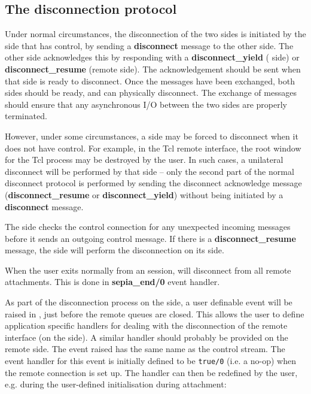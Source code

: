 \subsection{The disconnection protocol}
\label{disconnect}

Under normal circumstances, the disconnection of the two sides is initiated
by the side that has control, by sending a {\bf disconnect} message to the
other side. The other side acknowledges this by responding with a {\bf
disconnect_yield} ({\eclipse} side) or {\bf disconnect_resume} (remote
side). The acknowledgement should be sent when that side is ready to
disconnect. Once the messages have been exchanged, both sides should be ready,
and can physically disconnect. The exchange of messages should ensure that
any asynchronous I/O between the two sides are properly terminated. 

However, under some circumstances, a side may be forced to disconnect when
it does not have control. For example, in the Tcl remote interface, the
root window for the Tcl process may be destroyed by the user. In such
cases, a unilateral disconnect will be performed by that side -- only the
second part of the normal disconnect protocol is performed by sending the
disconnect acknowledge message ({\bf disconnect_resume} or {\bf
disconnect_yield}) without being initiated by a {\bf disconnect} message. 

The {\eclipse} side checks the control connection for any unexpected
incoming messages before it sends an outgoing control message. If there is
a {\bf disconnect_resume} message, the {\eclipse} side will perform the
disconnection on its side. 

When the user exits normally from an {\eclipse} session, {\eclipse} will
disconnect from all remote attachments. This is done in {\bf sepia_end/0}
event handler.

As part of the disconnection process on the {\eclipse} side, a user
definable event will be raised in {\eclipse}, just before the remote queues
are closed. This allows the user to define application specific handlers
for dealing with the disconnection of the remote interface (on the
{\eclipse} side). A similar handler should
probably be provided on the remote side. The event raised has the same name
as the control stream. The event handler for this event is initially
defined to be {\tt true/0} (i.e. a no-op) when the remote connection is set
up. The handler can then be redefined by the user, e.g. during the
user-defined initialisation during attachment:

